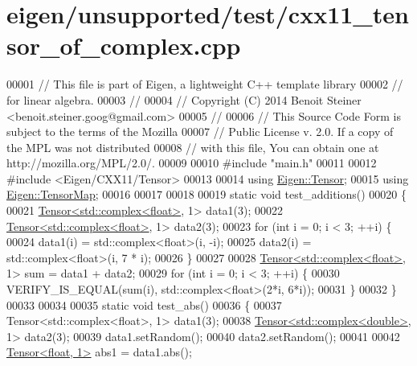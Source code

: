 \hypertarget{eigen_2unsupported_2test_2cxx11__tensor__of__complex_8cpp_source}{}\section{eigen/unsupported/test/cxx11\+\_\+tensor\+\_\+of\+\_\+complex.cpp}
\label{eigen_2unsupported_2test_2cxx11__tensor__of__complex_8cpp_source}

\begin{DoxyCode}
00001 \textcolor{comment}{// This file is part of Eigen, a lightweight C++ template library}
00002 \textcolor{comment}{// for linear algebra.}
00003 \textcolor{comment}{//}
00004 \textcolor{comment}{// Copyright (C) 2014 Benoit Steiner <benoit.steiner.goog@gmail.com>}
00005 \textcolor{comment}{//}
00006 \textcolor{comment}{// This Source Code Form is subject to the terms of the Mozilla}
00007 \textcolor{comment}{// Public License v. 2.0. If a copy of the MPL was not distributed}
00008 \textcolor{comment}{// with this file, You can obtain one at http://mozilla.org/MPL/2.0/.}
00009 
00010 \textcolor{preprocessor}{#include "main.h"}
00011 
00012 \textcolor{preprocessor}{#include <Eigen/CXX11/Tensor>}
00013 
00014 \textcolor{keyword}{using} \hyperlink{class_eigen_1_1_tensor}{Eigen::Tensor};
00015 \textcolor{keyword}{using} \hyperlink{class_eigen_1_1_tensor_map}{Eigen::TensorMap};
00016 
00017 
00018 
00019 \textcolor{keyword}{static} \textcolor{keywordtype}{void} test\_additions()
00020 \{
00021   \hyperlink{class_eigen_1_1_tensor}{Tensor<std::complex<float>}, 1> data1(3);
00022   \hyperlink{class_eigen_1_1_tensor}{Tensor<std::complex<float>}, 1> data2(3);
00023   \textcolor{keywordflow}{for} (\textcolor{keywordtype}{int} i = 0; i < 3; ++i) \{
00024     data1(i) = std::complex<float>(i, -i);
00025     data2(i) = std::complex<float>(i, 7 * i);
00026   \}
00027 
00028   \hyperlink{class_eigen_1_1_tensor}{Tensor<std::complex<float>}, 1> sum = data1 + data2;
00029   \textcolor{keywordflow}{for} (\textcolor{keywordtype}{int} i = 0; i < 3; ++i) \{
00030     VERIFY\_IS\_EQUAL(sum(i),  std::complex<float>(2*i, 6*i));
00031   \}
00032 \}
00033 
00034 
00035 \textcolor{keyword}{static} \textcolor{keywordtype}{void} test\_abs()
00036 \{
00037   Tensor<std::complex<float>, 1> data1(3);
00038   \hyperlink{class_eigen_1_1_tensor}{Tensor<std::complex<double>}, 1> data2(3);
00039   data1.setRandom();
00040   data2.setRandom();
00041 
00042   \hyperlink{class_eigen_1_1_tensor}{Tensor<float, 1>} abs1 = data1.abs();

\end{DoxyCode}
